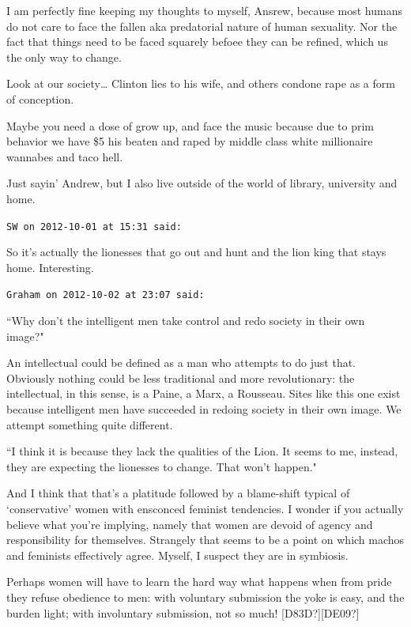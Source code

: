 \begin{footnotesize}
\begin{sffamily}
I am perfectly fine keeping my thoughts to myself, Ansrew, because most humans do not care to face the fallen aka predatorial nature of human sexuality. Nor the fact that things need to be faced squarely befoee they can be refined, which us the only way to change.

Look at our society… Clinton lies to his wife, and others condone rape as a form of conception.

Maybe you need a dose of grow up, and face the music because due to prim behavior we have \$5 his beaten and raped by middle class white millionaire wannabes and taco hell.

Just sayin' Andrew, but I also live outside of the world of library, university and home.


\hfill

\texttt{SW on 2012-10-01 at 15:31 said: }

So it's actually the lionesses that go out and hunt and the lion king that stays home. Interesting.


\hfill

\texttt{Graham on 2012-10-02 at 23:07 said: }

``Why don't the intelligent men take control and redo society in their own image?"

An intellectual could be defined as a man who attempts to do just that. Obviously nothing could be less traditional and more revolutionary: the intellectual, in this sense, is a Paine, a Marx, a Rousseau. Sites like this one exist because intelligent men have succeeded in redoing society in their own image. We attempt something quite different.

``I think it is because they lack the qualities of the Lion. It seems to me, instead, they are expecting the lionesses to change. That won't happen."

And I think that that's a platitude followed by a blame-shift typical of `conservative' women with ensconced feminist tendencies. I wonder if you actually believe what you're implying, namely that women are devoid of agency and responsibility for themselves. Strangely that seems to be a point on which machos and feminists effectively agree. Myself, I suspect they are in symbiosis. 

Perhaps women will have to learn the hard way what happens when from pride they refuse obedience to men: with voluntary submission the yoke is easy, and the burden light; with involuntary submission, not so much! [D83D?][DE09?]


\hfill


\end{sffamily}
\end{footnotesize}
